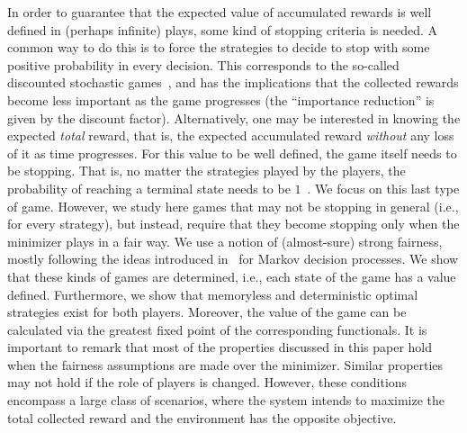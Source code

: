         In order to guarantee that the expected value of accumulated rewards is well defined in (perhaps infinite) plays, some kind of stopping criteria is needed.  A common way to do this is to force the strategies to decide to stop with some positive probability in every decision.  This corresponds to the so-called discounted stochastic games~\cite{Shapley1095,FilarV96}, and has the implications that the collected rewards become less important  as the game progresses (the ``importance reduction'' is given by the discount factor).  Alternatively, one may be interested in knowing the expected \emph{total} reward, that is, the expected accumulated reward \emph{without} any loss of it as time progresses.  For this value to be well defined, the game itself needs to be stopping. That is, no matter the strategies played by the players, the probability of reaching a terminal state needs to be $1$~\cite{Condon90,FilarV96}.
        We focus on this last type of game.  However, we study here games that may not be stopping in general (i.e., for every strategy), but instead, require that they become stopping only when the minimizer plays in a fair way.  
        We use a  notion of (almost-sure) strong fairness, mostly following the ideas introduced in~\cite{DBLP:journals/dc/BaierK98} for Markov decision processes. We show that these kinds of games are determined, i.e., each state of the game has a value defined.  Furthermore, we show that memoryless and deterministic optimal  strategies exist for both players. Moreover, the value of the game can be calculated via the greatest fixed point of the corresponding functionals. 
It is important to remark that most of the properties discussed in this paper hold when the fairness assumptions are  made over the minimizer. Similar properties may not hold if the role of players is changed. 
However, these conditions encompass a large class of scenarios, where the system intends to maximize the total collected reward and the environment has the opposite objective.

